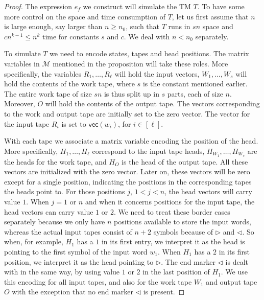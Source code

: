 \begin{proof}
	The expression $e_f$ we construct will simulate the TM $T$. To have some more control on the space 
	and time consumption of $T$, let us first assume that $n$ is large enough, say larger than $n\geq n_0$, 
	such that $T$ runs in $sn$ space and $cn^{k-1}\leq n^k$ time for constants $s$ and $c$. We deal with $n<n_0$ separately.

    To simulate $T$ we need to encode states, tapes and head positions. The matrix variables in 
    $\mathcal{M}$ mentioned in the proposition will take these roles. More specifically, the variables 
    $R_1,\ldots,R_\ell$ will hold the input vectors, $W_1,\ldots,W_s$ will hold the contents of the work
    tape, where $s$ is the constant mentioned earlier.
	The entire work tape of size $sn$ is thus split up in $s$ parts, each of size $n$.
	Moreover, $O$ will hold the contents of the output tape. 
	The vectors corresponding to the work and output tape are initially set to the zero vector. 
    The vector for the input tape $R_i$ is set to $\mathsf{vec}(w_i)$, for $i\in[\ell]$.

\smallskip
    With each tape we associate a matrix variable encoding the position of the head. More specifically, 
    $H_1,\ldots,H_\ell$ correspond to the input tape heads,
    $H_{W_1},\ldots, H_{W_s}$ are the heads for the work tape, and $H_O$ is the head of the output tape. 
    All these vectors are initialized with the zero vector. Later on, these vectors will be zero except 
    for a single position, indicating the positions in the corresponding tapes the heads point to. 
    For those positions $j$, $1<j<n$, the head vectors will carry value $1$.  When $j=1$ or $n$ and when 
    it concerns positions for the input tape, the head vectors can carry value $1$ or $2$. We need to treat 
    these border cases separately
    because we only have $n$ positions available to store the input words, whereas the actual input tapes 
    consist of $n+2$ symbols because of $\rhd$ and $\lhd$. So when, for example, $H_1$ has a $1$ in its first
    entry, we interpret it as the head is pointing to the first symbol of the input word $w_1$. When $H_1$
    has a $2$ in its first position, we interpret it as the head pointing to $\rhd$. The end marker $\lhd$ is
    dealt with in the same way, by using value $1$ or $2$ in the last position of $H_1$. We use this encoding
    for all input tapes, and also for the work tape $W_1$ and output tape $O$ with the exception that no end 
    marker $\lhd$ is present.



\end{proof}
